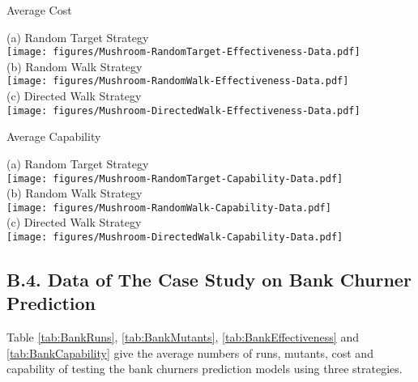 \documentclass[preprint,1p,authoryear,times]{elsarticle}
\begin{document}
\begin{table}[htbp]
	\caption{Average Cost}	\label{tab:MushroomEffectiveness}
	\begin{center}
	\scriptsize{(a) Random Target Strategy}\\
	\texttt{[image: figures/Mushroom-RandomTarget-Effectiveness-Data.pdf]}\\
	\scriptsize{(b) Random Walk Strategy}\\
	\texttt{[image: figures/Mushroom-RandomWalk-Effectiveness-Data.pdf]}\\
		\scriptsize{(c) Directed Walk Strategy}\\
	\texttt{[image: figures/Mushroom-DirectedWalk-Effectiveness-Data.pdf]}\\
	\end{center}
\end{table}

\begin{table}[htbp]
	\caption{Average Capability}	\label{tab:MushroomCapability}
	\begin{center}
	\scriptsize{(a) Random Target Strategy}\\
	\texttt{[image: figures/Mushroom-RandomTarget-Capability-Data.pdf]}\\
	\scriptsize{(b) Random Walk Strategy}\\
	\texttt{[image: figures/Mushroom-RandomWalk-Capability-Data.pdf]}\\
		\scriptsize{(c) Directed Walk Strategy}\\
	\texttt{[image: figures/Mushroom-DirectedWalk-Capability-Data.pdf]}\\
	\end{center}
\end{table}

\newpage
\subsection*{B.4. Data of The Case Study on Bank Churner Prediction}

Table \ref{tab:BankRuns}, \ref{tab:BankMutants}, \ref{tab:BankEffectiveness} and \ref{tab:BankCapability} give the average numbers of runs, mutants, cost and capability of testing the bank churners prediction models using three strategies.  
\end{document}
